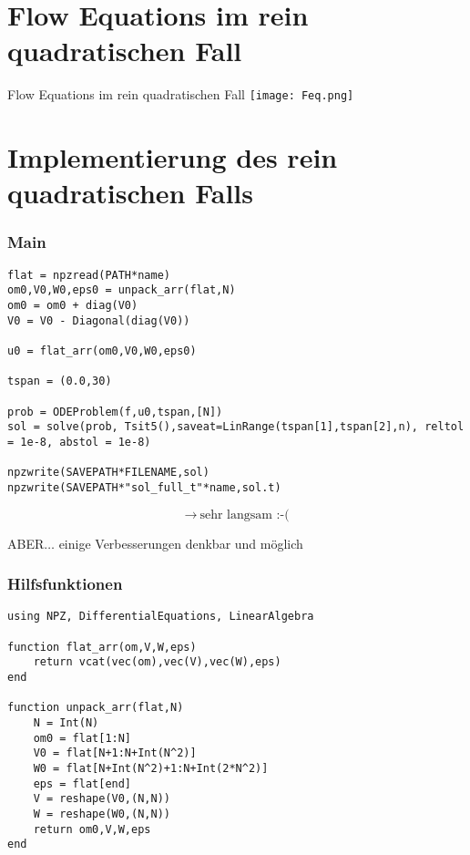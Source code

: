 \documentclass{beamer}
\begin{document}
\section{Flow Equations im rein quadratischen Fall}
\begin{frame}{Flow Equations im rein quadratischen Fall}
\texttt{[image: Feq.png]}
\end{frame}
\section{Implementierung des rein quadratischen Falls}
\begin{frame}[fragile]

\frametitle{Main}

\begin{verbatim}
flat = npzread(PATH*name)
om0,V0,W0,eps0 = unpack_arr(flat,N)
om0 = om0 + diag(V0)        
V0 = V0 - Diagonal(diag(V0))
        
u0 = flat_arr(om0,V0,W0,eps0)

tspan = (0.0,30)

prob = ODEProblem(f,u0,tspan,[N])
sol = solve(prob, Tsit5(),saveat=LinRange(tspan[1],tspan[2],n), reltol = 1e-8, abstol = 1e-8)
        
npzwrite(SAVEPATH*FILENAME,sol)
npzwrite(SAVEPATH*"sol_full_t"*name,sol.t)
\end{verbatim}

$$\rightarrow\ \text{sehr langsam :-(}$$

\vfill
ABER$\ldots$ einige Verbesserungen denkbar und möglich

\end{frame}
\begin{frame}[fragile]

\frametitle{Hilfsfunktionen}

\begin{verbatim}
using NPZ, DifferentialEquations, LinearAlgebra

function flat_arr(om,V,W,eps)
    return vcat(vec(om),vec(V),vec(W),eps)
end

function unpack_arr(flat,N)
    N = Int(N)
    om0 = flat[1:N]
    V0 = flat[N+1:N+Int(N^2)]
    W0 = flat[N+Int(N^2)+1:N+Int(2*N^2)]
    eps = flat[end]
    V = reshape(V0,(N,N))
    W = reshape(W0,(N,N))
    return om0,V,W,eps
end
\end{verbatim}

\end{frame}
\end{document}
